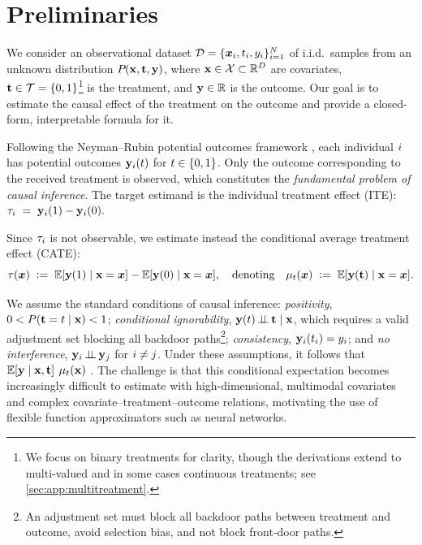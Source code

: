 \section{Preliminaries}
\label{sec:background}

We consider an observational dataset $\mathcal{D} = \{{\bm{x}}_i, t_i, y_i\}_{i = 1}^{N}$ of \samplesize i.i.d.\ samples from an unknown distribution ${P}_{}({\mathbf{x}}, {\mathbf{t}}, {\mathbf{y}})$, where ${\mathbf{x}} \in \mathcal{X} \subset \mathbb{R}^{D}$ are covariates, ${\mathbf{t}} \in \mathcal{T} = \{0,1\}$\footnote{We focus on binary treatments for clarity, though the derivations extend to multi-valued and in some cases continuous treatments; see \cref{sec:app:multitreatment}.} is the treatment, and ${\mathbf{y}} \in \mathbb{R}$ is the outcome. Our goal is to estimate the causal effect of the treatment on the outcome and provide a closed-form, interpretable formula for it.

Following the Neyman--Rubin potential outcomes framework \citep{neyman1990application,rubin1974estimating}, each individual $i$ has potential outcomes ${\mathbf{y}}_i(t)$ for $t \in \{0,1\}$. Only the outcome corresponding to the received treatment is observed, which constitutes the \emph{fundamental problem of causal inference}. The target estimand is the individual treatment effect (ITE):
$
\tau_i \;=\; {\mathbf{y}}_i(1) - {\mathbf{y}}_i(0).
$

Since $\tau_i$ is not observable, we estimate instead the conditional average treatment effect (CATE):
\begin{equation}
\tau({\bm{x}}) \;\vcentcolon=\; \operatorname{\mathbb{E}}[{\mathbf{y}}(1)\mid {\mathbf{x}}={\bm{x}}] - \operatorname{\mathbb{E}}[{\mathbf{y}}(0)\mid {\mathbf{x}}={\bm{x}}], \quad \text{denoting} \quad \mu_t({\bm{x}}) \;\vcentcolon=\; \operatorname{\mathbb{E}}[{\mathbf{y}}({\mathbf{t}})\mid {\mathbf{x}}={\bm{x}}].
\end{equation}

We assume the standard conditions of causal inference: \itemi \emph{positivity}, $0 < P({\mathbf{t}}=t \mid {\mathbf{x}}) < 1$; \itemii \emph{conditional ignorability}, ${\mathbf{y}}(t) {\,\perp\!\!\!\perp\,} {\mathbf{t}} \mid {\mathbf{x}}$, which requires a valid adjustment set blocking all backdoor paths\footnote{An adjustment set must block all backdoor paths between treatment and outcome, avoid selection bias, and not block front-door paths.}; \itemiii \emph{consistency}, ${\mathbf{y}}_i(t_i) = y_i$; and \itemiv \emph{no interference}, ${\mathbf{y}}_i {\,\perp\!\!\!\perp\,} {\mathbf{y}}_j$ for $i \neq j$. Under these assumptions, it follows that
$
\operatorname{\mathbb{E}}[{\mathbf{y}} \mid {\mathbf{x}}, {\mathbf{t}}]
$
 $\mu_t({\mathbf{x}})$ \citep{HernanRobins2025}. The challenge is that this conditional expectation becomes increasingly difficult to estimate with high-dimensional, multimodal covariates and complex covariate--treatment--outcome relations, motivating the use of flexible function approximators such as neural networks.

